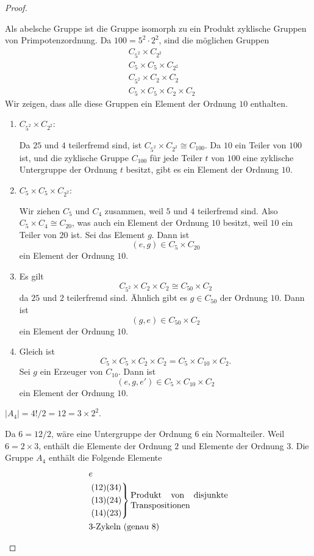 \begin{proof}
	\begin{parts}
	\item Als abelsche Gruppe ist die Gruppe isomorph zu ein Produkt zyklische Gruppen von Primpotenzordnung. Da $100=5^2\cdot 2^2$, sind die möglichen Gruppen
	\begin{align*}
		&C_{5^2}\times C_{2^2}\\
		&C_5\times C_5 \times C_{2^2}\\
		&C_{5^2}\times C_2\times C_2\\
		&C_5\times C_5\times C_2\times C_2
	\end{align*}
	Wir zeigen, dass alle diese Gruppen ein Element der Ordnung $10$ enthalten.
	\begin{enumerate}[label=(\arabic*)]
		\item $C_{5^2}\times C_{2^2 }$:

			Da $25$ und $4$ teilerfremd sind, ist $C_{5^2}\times C_{2^2}\cong C_{100}$. Da $10$ ein Teiler von $100$ ist, und die zyklische Gruppe $C_{100}$ f\"{u}r jede Teiler $t$ von $100$ eine zyklische Untergruppe der Ordnung $t$ besitzt, gibt es ein Element der Ordnung $10$.
		\item $C_5\times C_5\times C_{2^2}$:

			Wir ziehen $C_5$ und $C_4$ zusammen, weil $5$ und $4$ teilerfremd sind. Also $C_5\times C_4\cong C_{20}$, was auch ein Element der Ordnung $10$ besitzt, weil $10$ ein Teiler von $20$ ist. Sei das Element $g$. Dann ist
			\[
				(e,g)\in C_5\times C_{20}
			\]
			ein Element der Ordnung $10$.
		\item Es gilt
			\[
				C_{5^2}\times C_2\times C_2\cong C_{50}\times C_2
			\]
			da $25$ und $2$ teilerfremd sind. Ähnlich gibt es $g\in C_{50}$ der Ordnung $10$. Dann ist
			\[
				(g, e)\in C_{50}\times C_2
		\]
		ein Element der Ordnung $10$.
	\item Gleich ist
		\[
		C_5\times C_5\times C_2\times C_2=C_5\times C_{10}\times C_2
	.\]
	Sei $g$ ein Erzeuger von $C_{10}$. Dann ist
	\[
		(e, g, e')\in C_5\times C_{10}\times C_2
	\]
	ein Element der Ordnung $10$.
	\end{enumerate}
\item $|A_4|= 4! / 2 = 12=3\times 2^2$.

	Da $6 = 12 / 2$, wäre eine Untergruppe der Ordnung $6$ ein Normalteiler. Weil $6=2\times 3$, enthält die Elemente der Ordnung $2$ und Elemente der Ordnung $3$. Die Gruppe $A_4$ enthält die Folgende Elemente
	\begin{align*}
		&e\\
		&\left.
			\begin{aligned}
				&(12)(34)\\
				&(13)(24)\\
				&(14)(23)
			\end{aligned}
		\right\}\text{\parbox{4cm}{Produkt von disjunkte Transpositionen}}\\
		&\text{3-Zykeln (genau 8)}
	\end{align*}
\end{parts}
\end{proof}
